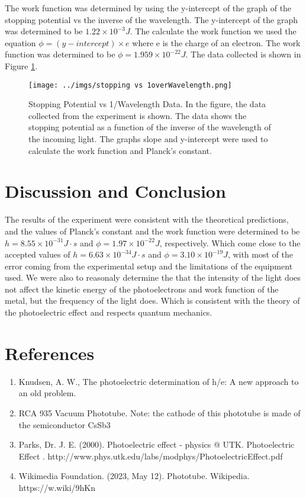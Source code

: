\documentclass[12pt]{article}
\begin{document}
        The work function was determined by using the y-intercept of the graph of the stopping potential vs the inverse of the wavelength. The y-intercept of the graph was determined to be \( 1.22 \times 10^{-3} J \).
        The calculate the work function we used the equation \( \phi = (y-intercept) \times e \) where e is the charge of an electron. The work function was determined to be \( \phi = 1.959 \times 10^{-22} J \).
        The data collected is shown in Figure \ref{fig: Stopping Potential vs 1/Wavelength Data}.

        \begin{figure}[!h]
                \centering
                \texttt{[image: ../imgs/stopping vs 1overWavelength.png]}
                \caption{Stopping Potential vs 1/Wavelength Data. In the figure, the data collected from the experiment is shown. The data shows 
                the stopping potential as a function of the inverse of the wavelength of the incoming light. The graphs slope and y-intercept were used to calculate
                the work function and Planck's constant.}
                \label{fig: Stopping Potential vs 1/Wavelength Data}
        \end{figure}


\section{Discussion and Conclusion}
        The results of the experiment were consistent with the theoretical predictions, and the values of Planck's constant and the 
        work function were determined to be \( h = 8.55 \times 10^{-31} J \cdot s \) and \( \phi = 1.97 \times 10^{-22} J \), respectively. 
        Which come close to the accepted values of \( h = 6.63 \times 10^{-34} J \cdot s \) and \( \phi = 3.10 \times 10^{-19} J \), with most of the error coming from the experimental setup and the
        limitations of the equipment used. We were also to reasonaly determine the that the intensity of the light
        does not affect the kinetic energy of the photoelectrons and work function of the metal, but the frequency of the light does. Which is 
        consistent with the theory of the photoelectric effect and respects quantum mechanics.

\section{References}
    \begin{enumerate}
        \sloppy
        \item  Knudsen, A. W., The photoelectric determination of h/e: A new approach to an old problem.
        \item  RCA 935 Vacuum Phototube. Note: the cathode of this phototube is made of the semiconductor CsSb3
        \item Parks, Dr. J. E. (2000). Photoelectric effect - physics @ UTK. Photoelectric Effect . http://www.phys.utk.edu/labs/modphys/PhotoelectricEffect.pdf 
        \item Wikimedia Foundation. (2023, May 12). Phototube. Wikipedia. https://w.wiki/9hKn

    \end{enumerate}
\end{document}
